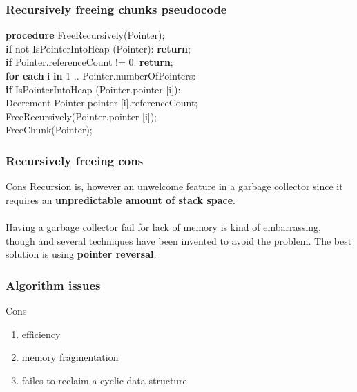 \documentclass[presentation]{beamer}
\begin{document}
\begin{frame}
  \frametitle{Recursively freeing chunks pseudocode}
  \justifying  
  \begin{block}{}
  \textbf{procedure} FreeRecursively(Pointer); \\
\hspace*{20pt} \textbf{if} not IsPointerIntoHeap (Pointer): \textbf{return};\\
\hspace*{20pt} \textbf{if} Pointer.referenceCount != 0: \textbf{return};\\
\hspace*{20pt} \textbf{for each} i \textbf{in} 1 .. Pointer.numberOfPointers: \\
\hspace*{40pt} \textbf{if} IsPointerIntoHeap (Pointer.pointer [i]): \\
\hspace*{60pt} Decrement Pointer.pointer [i].referenceCount; \\
\hspace*{60pt} FreeRecursively(Pointer.pointer [i]); \\
\hspace*{20pt} FreeChunk(Pointer); \\
  \end{block}
\end{frame}

\begin{frame}
  \frametitle{Recursively freeing cons} 
  \justifying
      \begin{alertblock}{Cons}
        Recursion is, however an unwelcome feature in a garbage collector since it requires an \textbf{unpredictable amount of stack space}. 
\\~\\        
\justifying
        Having a garbage collector fail for lack of memory is kind of embarrassing, though and several techniques
have been invented to avoid the problem. The best solution is using \textbf{pointer reversal}.
    \end{alertblock}
\end{frame}

\begin{frame}
  \frametitle{Algorithm issues} 
  \justifying
  \begin{alertblock}{Cons}
  	\begin{enumerate}
		\item efficiency
		\item memory fragmentation
		\item failes to reclaim a cyclic data structure 	
  	\end{enumerate}
  \end{alertblock}
\end{frame}
\end{document}
